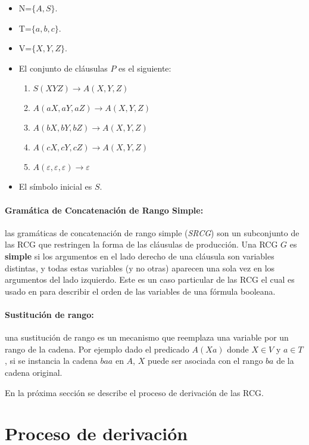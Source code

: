 \begin{itemize}
    \item  N=$\{A,S\}$.
    \item T=$\{a,b,c\}$.
    \item V=$\{X,Y,Z\}$.
    \item El conjunto de cláusulas $P$ es el siguiente:
          \begin{enumerate}
              \item $S(XYZ)\to A(X,Y,Z)$
              \item $A(aX,aY,aZ)\to A(X,Y,Z)$
              \item $A(bX,bY,bZ)\to A(X,Y,Z)$
              \item $A(cX,cY,cZ)\to A(X,Y,Z)$
              \item $A(\varepsilon,\varepsilon,\varepsilon)\to \varepsilon$
          \end{enumerate}
    \item El símbolo inicial es $S$.
\end{itemize}


\paragraph{Gramática de Concatenación de Rango Simple:} las gramáticas de concatenación de rango simple (\textit{SRCG}) son un subconjunto de las RCG que restringen la forma de las cláusulas de producción.
Una RCG $G$ es \textbf{simple} si los argumentos en el lado derecho de una cláusula son variables distintas, y todas estas variables (y no otras) aparecen una sola vez en los argumentos del lado izquierdo.
Este es un caso particular de las RCG el cual es usado en \cite{aSRCSAT} para describir el orden de las variables
de una fórmula booleana.

\paragraph{Sustitución de rango:} una sustitución de rango es un mecanismo que reemplaza una
variable por un rango de la cadena. Por ejemplo dado el predicado $A(Xa)$ donde $X \in V$ y $a \in T$,
si se instancia la cadena $baa$ en $A$, $X$ puede ser asociada con el rango $ba$ de la cadena original.

En la próxima sección se describe el proceso de derivación de las RCG.
\section{Proceso de derivación}


